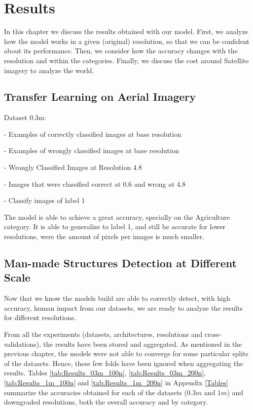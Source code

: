 
\chapter{Results} 

\label{Chapter5}


In this chapter we discuss the results obtained with our model. First, we analyze how the model works in a given (original) resolution, so that we can be confident about its performance. Then, we consider how the accuracy changes with the resolution and within the categories. Finally, we discuss the cost around Satellite imagery to analyze the world. 

\section{Transfer Learning on Aerial Imagery}

Dataset 0.3m:

- Examples of correctly classified images at base resolution

- Examples of wrongly classified images at base resolution

- Wrongly Classified Images at Resolution 4.8

- Images that were classified correct at 0.6 and wrong at 4.8

- Classify images of label 1

The model is able to achieve a great accuracy, specially on the Agriculture category. It is able to generalize to label 1, and still be accurate for lower resolutions, were the amount of pixels per images is much smaller.

\vspace{10cm}

\section{Man-made Structures Detection at Different Scale}

Now that we know the models build are able to correctly detect, with high accuracy, human impact from our datasets, we are ready to analyze the results for different resolutions.

From all the experiments (datasets, architectures, resolutions and cross-validations), the results have been stored and aggregated. As mentioned in the previous chapter, the models were not able to converge for some particular splits of the datasets. Hence, these few folds have been ignored when aggregating the results. Tables \ref{tab:Results_03m_100n}, \ref{tab:Results_03m_200n}, \ref{tab:Results_1m_100n} and \ref{tab:Results_1m_200n} in Appendix \ref{Tables} summarize the accuracies obtained for each of the datasets ($0.3m$ and $1m$) and downgraded resolutions, both the overall accuracy and by category. 

